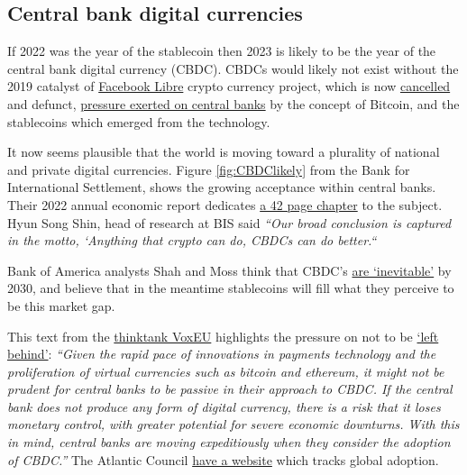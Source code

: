 \begin{itemize}
\section{Central bank digital currencies}
If 2022 was the year of the stablecoin then 2023 is likely to be the year of the central bank digital currency (CBDC). CBDCs would likely not exist without the 2019 catalyst of \href{https://www.thetimes.co.uk/article/facebooks-libra-cryptocurrency-project-ends-in-failure-cxvnnc3kx}{Facebook Libre} crypto currency project, which is now \href{https://fortune.com/2022/07/01/meta-novi-crypto-payments-wallet-end-september-2022/}{cancelled} and defunct, \href{https://www.theguardian.com/world/2021/jul/09/currency-and-control-why-china-wants-to-undermine-bitcoin}{pressure exerted on central banks} by the concept of Bitcoin, and the stablecoins which emerged from the technology.\par
It now seems plausible that the world is moving toward a plurality of national and private digital currencies. Figure \ref{fig:CBDClikely} from the Bank for International Settlement, shows the growing acceptance within central banks. Their 2022 annual economic report dedicates \href{https://www.bis.org/publ/arpdf/ar2022e3.pdf}{a 42 page chapter} to the subject. Hyun Song Shin, head of research at BIS said \textit{``Our broad conclusion is captured in the motto, ‘Anything that crypto can do, CBDCs can do better.``}\par
Bank of America analysts Shah and Moss think that CBDC's \href{}{are `inevitable'} by 2030, and believe that in the meantime stablecoins will fill what they perceive to be this market gap.\par
This text from the \href{https://voxeu.org/article/benefits-central-bank-digital-currency}{thinktank VoxEU} highlights the pressure on not to be \href{https://himes.house.gov/u-s-central-bank-digital-currency}{`left behind'}: \textit{``Given the rapid pace of innovations in payments technology and the proliferation of virtual currencies such as bitcoin and ethereum, it might not be prudent for central banks to be passive in their approach to CBDC. If the central bank does not produce any form of digital currency, there is a risk that it loses monetary control, with greater potential for severe economic downturns. With this in mind, central banks are moving expeditiously when they consider the adoption of CBDC.''} The Atlantic Council \href{https://www.atlanticcouncil.org/cbdctracker/}{have a website} which tracks global adoption.\par\par

\end{itemize}
